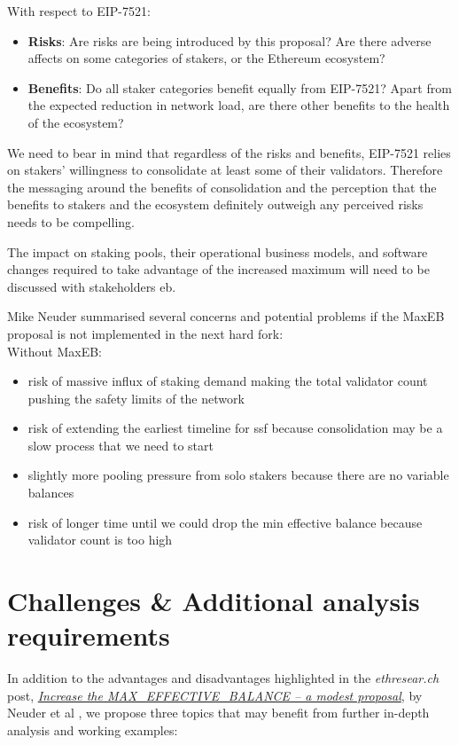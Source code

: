 \documentclass[UTF8]{article}
\begin{document}
\noindent
With respect to EIP-7521:
\begin{itemize}
\item \textbf{Risks}: Are risks are being introduced by this proposal? Are there adverse affects on some categories of stakers, or the Ethereum ecosystem?
\item  \textbf{Benefits}: Do all staker categories benefit equally from EIP-7521? Apart from the expected reduction in network load, are there other benefits to the health of the ecosystem?
\end{itemize}

We need to bear in mind that regardless of the risks and benefits, EIP-7521 relies on stakers' willingness to consolidate at least some of their validators. Therefore the messaging around the benefits of consolidation and the perception that the benefits to stakers and the ecosystem definitely outweigh any perceived risks needs to be compelling.

The impact on staking pools, their operational business models, and software changes required to take advantage of the increased maximum will need to be discussed with stakeholders \gls{eb}.

Mike Neuder summarised several concerns and potential problems if the MaxEB proposal is not implemented in the next hard fork:\\
\noindent
Without MaxEB:
\begin{itemize}
\item risk of massive influx of staking demand making the total validator count pushing the safety limits of the network
\item risk of extending the earliest timeline for \gls{ssf} because consolidation may be a slow process that we need to start
\item slightly more pooling pressure from solo stakers because there are no variable balances
\item risk of longer time until we could drop the min effective balance because validator count is too high
\end{itemize}

\clearpage
\section{Challenges \& Additional analysis requirements}
\label{sec:challenges}
In addition to the advantages and disadvantages highlighted in the \textit{ethresear.ch} post, \href{https://ethresear.ch/t/increase-the-max-effective-balance-a-modest-proposal/15801/3}{\textit{Increase the MAX\_EFFECTIVE\_BALANCE – a modest proposal}}, by  Neuder et al  \cite{Neuder2023a}, we propose three topics that may benefit from further in-depth analysis and working examples:
\end{document}
